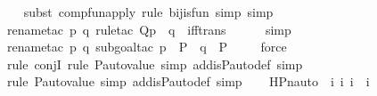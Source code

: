 \begin{isabellebody}
\ \ \isamarkupfalse%
{\isacharparenleft}{\kern0pt}subst\ comp{\isacharunderscore}{\kern0pt}fun{\isacharunderscore}{\kern0pt}apply{\isacharcomma}{\kern0pt}\ rule\ bij{\isacharunderscore}{\kern0pt}is{\isacharunderscore}{\kern0pt}fun{\isacharcomma}{\kern0pt}\ simp{\isacharcomma}{\kern0pt}\ simp{\isacharparenright}{\kern0pt}\isanewline
\ \ \isamarkupfalse%
{\isacharparenleft}{\kern0pt}rename{\isacharunderscore}{\kern0pt}tac\ p\ q{\isacharcomma}{\kern0pt}\ rule{\isacharunderscore}{\kern0pt}tac\ Q{\isacharequal}{\kern0pt}{\isachardoublequoteopen}{\isacharparenleft}{\kern0pt}{\isasymtau}{\isacharbackquote}{\kern0pt}p\ {\isasympreceq}\ {\isasymtau}{\isacharbackquote}{\kern0pt}q{\isacharparenright}{\kern0pt}{\isachardoublequoteclose}\ \ iff{\isacharunderscore}{\kern0pt}trans{\isacharparenright}{\kern0pt}\ \isanewline
\ \ \ \isamarkupfalse%
\ simp\isanewline
\ \ \isamarkupfalse%
{\isacharparenleft}{\kern0pt}rename{\isacharunderscore}{\kern0pt}tac\ p\ q{\isacharcomma}{\kern0pt}\ subgoal{\isacharunderscore}{\kern0pt}tac\ {\isachardoublequoteopen}{\isasymtau}{\isacharbackquote}{\kern0pt}p\ {\isasymin}\ P\ {\isasymand}\ {\isasymtau}{\isacharbackquote}{\kern0pt}q\ {\isasymin}\ P{\isachardoublequoteclose}{\isacharparenright}{\kern0pt}\isanewline
\ \ \ \isamarkupfalse%
\ force\isanewline
\ \ \isamarkupfalse%
{\isacharparenleft}{\kern0pt}rule\ conjI{\isacharcomma}{\kern0pt}\ rule\ P{\isacharunderscore}{\kern0pt}auto{\isacharunderscore}{\kern0pt}value{\isacharcomma}{\kern0pt}\ simp\ add{\isacharcolon}{\kern0pt}is{\isacharunderscore}{\kern0pt}P{\isacharunderscore}{\kern0pt}auto{\isacharunderscore}{\kern0pt}def{\isacharcomma}{\kern0pt}\ simp{\isacharparenright}{\kern0pt}\isanewline
\ \ \isamarkupfalse%
{\isacharparenleft}{\kern0pt}rule\ P{\isacharunderscore}{\kern0pt}auto{\isacharunderscore}{\kern0pt}value{\isacharcomma}{\kern0pt}\ simp\ add{\isacharcolon}{\kern0pt}is{\isacharunderscore}{\kern0pt}P{\isacharunderscore}{\kern0pt}auto{\isacharunderscore}{\kern0pt}def{\isacharcomma}{\kern0pt}\ simp{\isacharparenright}{\kern0pt}\isanewline
\ \ \isamarkupfalse%
%
\endisatagproof
{\isafoldproof}%
%
\isadelimproof
\isanewline
%
\endisadelimproof
\isanewline
{}\isamarkupfalse%
\ HPn{\isacharunderscore}{\kern0pt}auto\ {\isacharcolon}{\kern0pt}{\isacharcolon}{\kern0pt}\ {\isachardoublequoteopen}{\isacharbrackleft}{\kern0pt}i{\isacharcomma}{\kern0pt}\ i{\isacharcomma}{\kern0pt}\ i{\isacharbrackright}{\kern0pt}\ {\isasymRightarrow}\ i{\isachardoublequoteclose}\ \ \isanewline

\end{isabellebody}
